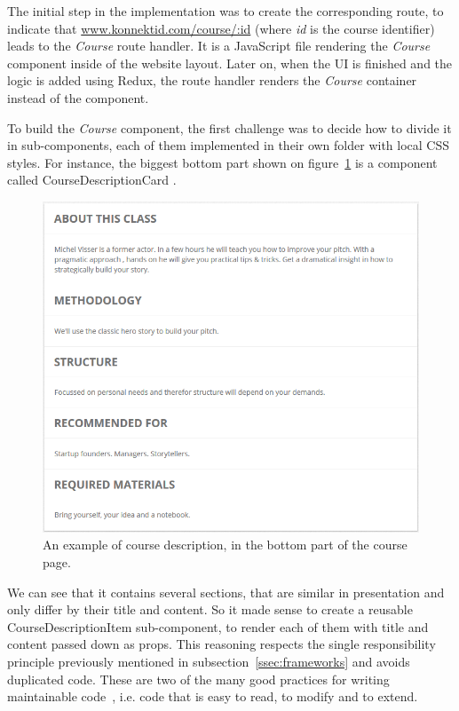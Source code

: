 The initial step in the implementation was to create the corresponding route, to indicate that \url{www.konnektid.com/course/:id} (where \textit{id} is the course identifier) leads to the \textit{Course} route handler. It is a JavaScript file rendering the \textit{Course} component inside of the website layout. Later on, when the UI is finished and the logic is added using Redux, the route handler renders the \textit{Course} container instead of the component.

To build the \textit{Course} component, the first challenge was to decide how to divide
it in sub-components, each of them implemented in their own folder with local CSS styles. For instance, the biggest bottom part shown on {\sc figure}~\ref{fig:courseDescription} is a component called \guillemotleft{} CourseDescriptionCard \guillemotright{}.

\begin{figure}[H]
    \centering
    \includegraphics[scale=0.6]{figure/courseDescription.png}
    \caption{An example of course description, in the bottom part of the course page.}
    \label{fig:courseDescription}
\end{figure} 

We can see that it contains several sections, that are similar in presentation and only differ by their title and content. So
it made sense to create a reusable \guillemotleft{} CourseDescriptionItem \guillemotright{} sub-component, to render each of them with title and content passed down as props. This reasoning respects the single responsibility principle previously mentioned in {\sc subsection}~\ref{ssec:frameworks} and avoids duplicated code.
These are two of the many good practices for writing maintainable code~\cite{maintainable}, i.e. code that is easy to read, to modify and to extend.

